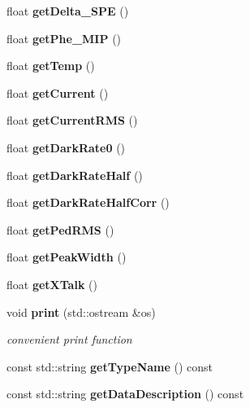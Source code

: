 \begin{DoxyCompactItemize}
\item 
float {\bfseries get\-Delta\-\_\-\-S\-P\-E} ()\label{classCALICE_1_1TilesItep_a993822f7f20966e669e13bdaacd6ef85}

\item 
float {\bfseries get\-Phe\-\_\-\-M\-I\-P} ()\label{classCALICE_1_1TilesItep_a35846842f8e7605fc8bb93bfb52c0f6c}

\item 
float {\bfseries get\-Temp} ()\label{classCALICE_1_1TilesItep_a404fc9ff07ba51ecf1399bed3ba4e80f}

\item 
float {\bfseries get\-Current} ()\label{classCALICE_1_1TilesItep_a455610d588f32d1db3d549dbdb141c11}

\item 
float {\bfseries get\-Current\-R\-M\-S} ()\label{classCALICE_1_1TilesItep_a19a98deda22ecd36e95a92b7e6b10470}

\item 
float {\bfseries get\-Dark\-Rate0} ()\label{classCALICE_1_1TilesItep_a4337a0d37c55a087b0bdbfdd7e2193fc}

\item 
float {\bfseries get\-Dark\-Rate\-Half} ()\label{classCALICE_1_1TilesItep_abc4d44fb3229652f685fcb10f126dd95}

\item 
float {\bfseries get\-Dark\-Rate\-Half\-Corr} ()\label{classCALICE_1_1TilesItep_acc22ca8901fcdf15fa7e7c858f065a24}

\item 
float {\bfseries get\-Ped\-R\-M\-S} ()\label{classCALICE_1_1TilesItep_abca9b88acfc9eca8808f20fc07508cbe}

\item 
float {\bfseries get\-Peak\-Width} ()\label{classCALICE_1_1TilesItep_aade33716b5253d5873af04ba9ee8d6a2}

\item 
float {\bfseries get\-X\-Talk} ()\label{classCALICE_1_1TilesItep_a2531bbd09c0c70bfe43aadec23d23241}

\item 
void {\bf print} (std\-::ostream \&os)\label{classCALICE_1_1TilesItep_a267a95bfaf96cf6ef7341edafd00e6f0}

\begin{DoxyCompactList}\small\item\em convenient print function \end{DoxyCompactList}\item 
const std\-::string {\bfseries get\-Type\-Name} () const \label{classCALICE_1_1TilesItep_a1a775b544e0f52b5525dc1aef0a50f41}

\item 
const std\-::string {\bfseries get\-Data\-Description} () const \label{classCALICE_1_1TilesItep_a4958de37353853a6ae57adce6c345d19}

\end{DoxyCompactItemize}



